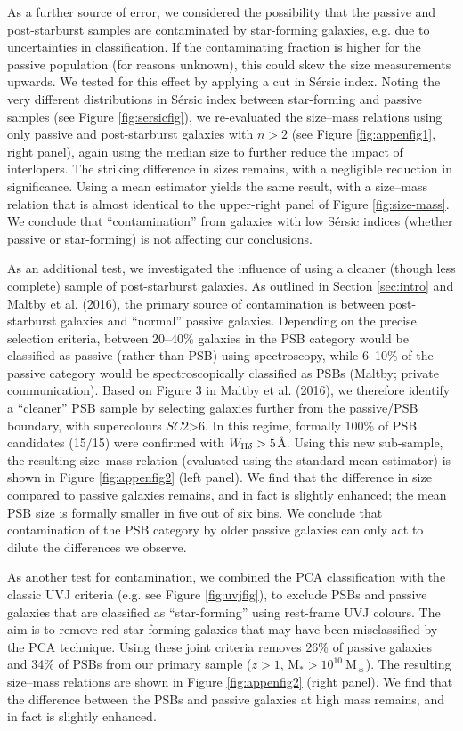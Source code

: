 \documentclass[a4paper,fleqn,usenatbib,useAMS]{mnras}
\begin{document}
As a further source of error, we considered the possibility that the
passive and post-starburst samples are contaminated by star-forming
galaxies, e.g. due to uncertainties in classification. If the
contaminating fraction is higher for the passive population (for
reasons unknown), this could skew the size measurements upwards.  We
tested for this effect by applying a cut in S\'{e}rsic index. Noting
the very different distributions in S\'{e}rsic index between
star-forming and passive samples (see Figure \ref{fig:sersicfig}), we
re-evaluated the size--mass relations using only passive and
post-starburst galaxies with $n>2$ (see Figure \ref{fig:appenfig1},
right panel), again using the median size to further reduce the impact
of interlopers.  The striking difference in sizes remains, with a
negligible reduction in significance.  Using a mean estimator yields
the same result, with a size--mass relation that is almost identical
to the upper-right panel of Figure \ref{fig:size-mass}.  We conclude
that ``contamination'' from galaxies with low S\'{e}rsic indices
(whether passive or star-forming) is not affecting our conclusions.

As an additional test, we investigated the influence of using a
cleaner (though less complete) sample of post-starburst galaxies.  As
outlined in Section \ref{sec:intro} and Maltby et al. (2016), the
primary source of contamination is between post-starburst galaxies and
``normal'' passive galaxies. Depending on the precise selection
criteria, between 20--40\% galaxies in the PSB category would be
classified as passive (rather than PSB) using spectroscopy, while
6--10\% of the passive category would be spectroscopically classified
as PSBs (Maltby; private communication).  Based on Figure 3 in Maltby
et al. (2016), we therefore identify a ``cleaner'' PSB sample by
selecting galaxies further from the passive/PSB boundary, with
supercolours $SC2$>6. In this regime, formally 100\% of PSB candidates
(15/15) were confirmed with $W_{\rm H\delta}>5$\AA. Using this new
sub-sample, the resulting size--mass relation (evaluated using the
standard mean estimator) is shown in Figure \ref{fig:appenfig2} (left
panel).  We find that the difference in size compared to passive
galaxies remains, and in fact is slightly enhanced; the mean PSB
size is formally smaller in five out of six bins. We conclude that
contamination of the PSB category by older passive galaxies can only
act to  dilute the differences we observe.

As another test for contamination, we combined the PCA classification
with the classic UVJ criteria (e.g.  see Figure \ref{fig:uvjfig}), to
exclude PSBs and passive galaxies that are classified as
``star-forming'' using rest-frame UVJ colours.  The aim is to remove
red star-forming galaxies that may have been misclassified by the
PCA technique.  Using these joint criteria removes  26\%
of passive galaxies and 34\% of PSBs
from our primary sample ($z>1$,  M$_{\ast}>10^{10} ~$M$_{\sun}$).
 The resulting size--mass relations are shown in Figure \ref{fig:appenfig2}
(right panel). We find that the difference between the PSBs and
passive galaxies at high mass remains, and in fact is slightly
enhanced. 
\end{document}
